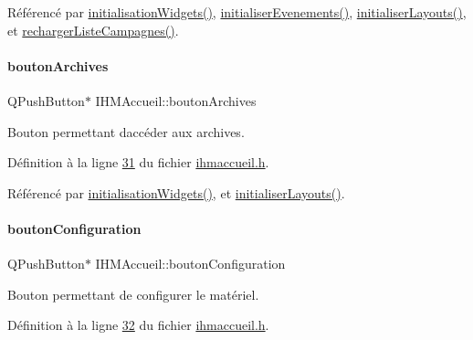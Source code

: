 Référencé par \hyperlink{ihmaccueil_8cpp_source_l00037}{initialisation\+Widgets()}, \hyperlink{ihmaccueil_8cpp_source_l00084}{initialiser\+Evenements()}, \hyperlink{ihmaccueil_8cpp_source_l00049}{initialiser\+Layouts()}, et \hyperlink{ihmaccueil_8cpp_source_l00092}{recharger\+Liste\+Campagnes()}.

\mbox{\label{class_i_h_m_accueil_a313a8c52763aa2978010db77ec6673ac}} 
\paragraph{\texorpdfstring{bouton\+Archives}{boutonArchives}}
{\footnotesize\ttfamily Q\+Push\+Button$\ast$ I\+H\+M\+Accueil\+::bouton\+Archives\hspace{0.3cm}{\ttfamily [private]}}



Bouton permettant d\textquotesingle{}accéder aux archives. 



Définition à la ligne \hyperlink{ihmaccueil_8h_source_l00031}{31} du fichier \hyperlink{ihmaccueil_8h_source}{ihmaccueil.\+h}.



Référencé par \hyperlink{ihmaccueil_8cpp_source_l00037}{initialisation\+Widgets()}, et \hyperlink{ihmaccueil_8cpp_source_l00049}{initialiser\+Layouts()}.

\mbox{\label{class_i_h_m_accueil_a8b8ed7d11ab66e3c6895b3c6129dc9c8}} 
\paragraph{\texorpdfstring{bouton\+Configuration}{boutonConfiguration}}
{\footnotesize\ttfamily Q\+Push\+Button$\ast$ I\+H\+M\+Accueil\+::bouton\+Configuration\hspace{0.3cm}{\ttfamily [private]}}



Bouton permettant de configurer le matériel. 



Définition à la ligne \hyperlink{ihmaccueil_8h_source_l00032}{32} du fichier \hyperlink{ihmaccueil_8h_source}{ihmaccueil.\+h}.



